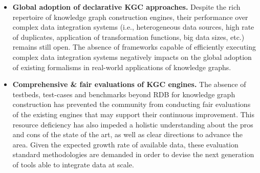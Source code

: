 \begin{itemize}
    \item \textbf{Global adoption of declarative KGC approaches.} Despite the rich repertoire of knowledge graph construction engines, their performance over complex data integration systems (i.e., heterogeneous data sources, high rate of duplicates, application of transformation functions, big data sizes, etc.) remains still open. The absence of frameworks capable of efficiently executing complex data integration systems negatively impacts on the global adoption of existing formalisms in real-world applications of knowledge graphs.
    \item \textbf{Comprehensive \& fair evaluations of KGC engines.} The absence of testbeds, test-cases and benchmarks beyond RDB for knowledge graph construction has prevented the community from conducting fair evaluations of the existing engines that may support their continuous improvement. This resource deficiency has also impeded a holistic understanding about the pros and cons of the state of the art, as well as clear directions to advance the area. Given the expected growth rate of available data, these evaluation standard methodologies are demanded in order to devise the next generation of tools able to integrate data at scale.
\end{itemize}